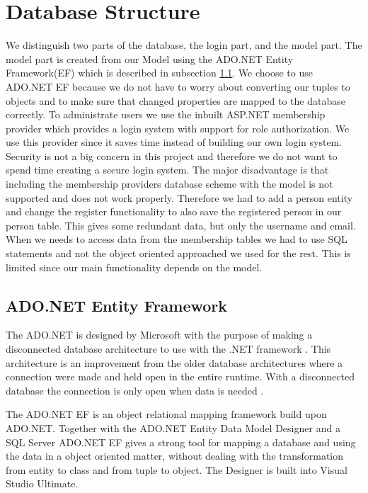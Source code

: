 \section{Database Structure}
\label{sec:databasestructure}

We distinguish two parts of the database, the login part, and the model part. 
The model part is created from our Model  using the ADO.NET Entity Framework(EF) which is described in subsection \ref{sub:adonet}. 
We choose to use ADO.NET EF because we do not have to worry about converting our tuples to objects and to make sure that changed properties are mapped to the database correctly.  
To administrate users we use the inbuilt ASP.NET membership provider which provides a login system with support for role authorization. 
We use this provider since it saves time instead of building our own login system. 
Security is not a big concern in this project and therefore we do not want to spend time creating a secure login system. 
The major disadvantage is that including the membership providers database scheme with the model is not supported and does not work properly. 
Therefore we had to add a person entity and change the register functionality to also save the registered person in our person table. 
This gives some redundant data, but only the username and email. 
When we needs to access data from the membership tables we had to use SQL statements and not the object oriented approached we used for the rest. 
This is limited since our main functionality depends on the model. 

\subsection{ADO.NET Entity Framework}
\label{sub:adonet}
The ADO.NET is designed by Microsoft with the purpose of making a disconnected database architecture to use with the .NET framework \cite{adonetDesignGoal}. 
This architecture is an improvement from the older database architectures where a connection were made and held open in the entire runtime. With a disconnected database the connection is only open when data is needed \cite{disconnectedData}. 

The ADO.NET EF is an object relational mapping framework \cite{adonetEntityFramework} build upon ADO.NET. 
Together with the ADO.NET Entity Data Model Designer and a SQL Server ADO.NET EF gives a strong tool for mapping a database and using the data in a object oriented matter, without dealing with the transformation from entity to class and from tuple to object. 
The Designer is built into Visual Studio Ultimate. 

